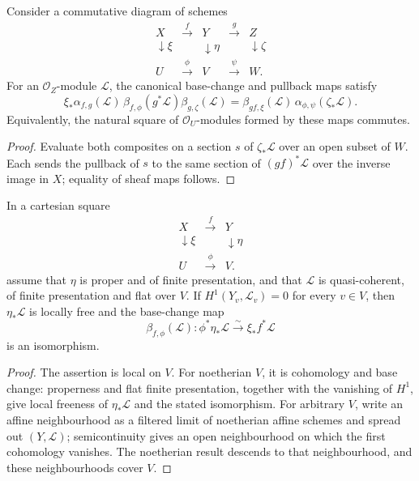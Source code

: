 \begin{proposition}\label{fga-pro-4-35}\uses{}
Consider a commutative diagram of schemes
\[
\begin{array}{ccccc}
X&\xrightarrow{f}&Y&\xrightarrow{g}&Z\\[-1mm]
\downarrow\!\xi&&\downarrow\!\eta&&\downarrow\!\zeta\\[-1mm]
U&\xrightarrow{\phi}&V&\xrightarrow{\psi}&W .
\end{array}
\]
For an $\mathcal O_Z$-module $\mathcal L$, the canonical base-change and
pullback maps satisfy
\[
\xi_*\alpha_{f,g}(\mathcal L)\,\beta_{f,\phi}(g^*\mathcal L)
 \beta_{g,\zeta}(\mathcal L)
=\beta_{gf,\xi}(\mathcal L)\,\alpha_{\phi,\psi}(\zeta_*\mathcal L).
\]
Equivalently, the natural square of $\mathcal O_U$-modules formed by these maps
commutes.
\end{proposition}
\begin{proof}
Evaluate both composites on a section $s$ of $\zeta_*\mathcal L$ over an open
subset of $W$.  Each sends the pullback of $s$ to the same section of
$(gf)^*\mathcal L$ over the inverse image in $X$; equality of sheaf maps follows.
\end{proof}

\begin{proposition}\label{fga-pro-4-37}
In a cartesian square
\[
\begin{array}{ccc}
X&\xrightarrow{f}&Y\\[-1mm]
\downarrow\!\xi&&\downarrow\!\eta\\[-1mm]
U&\xrightarrow{\phi}&V .
\end{array}
\]
assume that $\eta$ is proper and of finite presentation, and that $\mathcal L$
is quasi-coherent, of finite presentation and flat over $V$.  If
$H^1(Y_v,\mathcal L_v)=0$ for every $v\in V$, then $\eta_*\mathcal L$ is locally
free and the base-change map
\[
\beta_{f,\phi}(\mathcal L):\phi^*\eta_*\mathcal L
\xrightarrow{\sim}\xi_*f^*\mathcal L
\]
is an isomorphism.
\end{proposition}
\begin{proof}
The assertion is local on $V$.  For noetherian $V$, it is cohomology and base
change: properness and flat finite presentation, together with the vanishing of
$H^1$, give local freeness of $\eta_*\mathcal L$ and the stated isomorphism.
For arbitrary $V$, write an affine neighbourhood as a filtered limit of
noetherian affine schemes and spread out $(Y,\mathcal L)$; semicontinuity gives
an open neighbourhood on which the first cohomology vanishes.  The noetherian
result descends to that neighbourhood, and these neighbourhoods cover $V$.
\end{proof}

